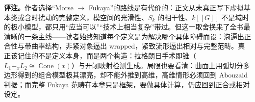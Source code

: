{\textbf{评注。}作者选择“Morse $\to$ Fukaya”的路线是有代价的：正文从未真正写下虚拟基本类或含时扰动的完整定义，模空间的光滑性、$S_k$ 的相干性、$k[[G]]$ 不是域时的极小模型，都只用“应当可以”“技术上相当复杂”带过。但这一取舍换来了全书最清晰的一条主线——读者始终知道每个定义是为解决哪个具体障碍而设：泡逼出正合性与带曲率结构，非紧对象逼出 wrapped，紧致流形逼出相对与完整范畴。真正该记住的不是定义本身，而是两个构造：拉格朗日手术即锥（$L_1+_xL_2\cong\operatorname{Cone}(x)$）与开闭映射检测生成。局限也要看清：曲面上用弧切分多边形得到的组合模型极其漂亮，却不能外推到高维，高维情形必须回到 Abouzaid 判据；而完整 Fukaya 范畴在本章只是框架，要做具体计算，仍应回到正合或相对设定。}
